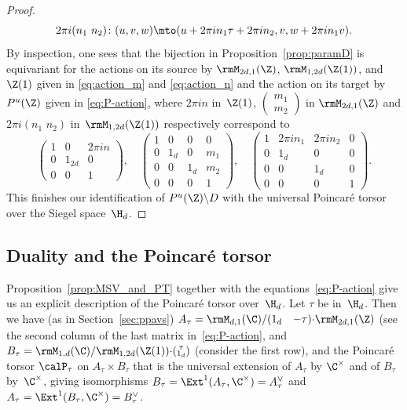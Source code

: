 \begin{proof}
\begin{equation}
\label{eq:action_n}
2\pi i(n_1\,\, n_2)\colon (u,v,w)\mto
(u+2\pi i n_1\tau+2\pi i n_2, v, w+2\pi i n_1v).
\end{equation}
By inspection, one sees that the bijection in
Proposition~\ref{prop:paramD} is equivariant for the actions on its
source by $\rmM_{2d,1}(\Z)$, $\rmM_{1,2d}(\Z(1))$, and~$\Z(1)$ given
in \eqref{eq:action_m} and \eqref{eq:action_n} and the action on its
target by $P^u(\Z)$ given in \eqref{eq:P-action}, where $2\pi i n$
in~$\Z(1)$, $(\substack{m_1\\m_2})$ in $\rmM_{2d,1}(\Z)$ and $2\pi
i(n_1\,\, n_2)$ in~$\rmM_{1,2d}(\Z(1))$ respectively correspond to
\begin{equation}\label{eq:equiv-actions}
\begin{pmatrix}
1 & 0 & 2\pi in\\
0 & 1_{2d} & 0\\
0 & 0 & 1
\end{pmatrix},\quad
\begin{pmatrix}
1 & 0 & 0 & 0\\
0 & 1_d & 0 & m_1\\
0 & 0 & 1_d & m_2\\
0 & 0 & 0 & 1
\end{pmatrix},\quad
\begin{pmatrix}
1 & 2\pi in_1 & 2\pi in_2 & 0\\
0 & 1_d & 0 & 0\\
0 & 0 & 1_d & 0\\
0 & 0 & 0 & 1
\end{pmatrix}.
\end{equation}
This finishes our identification of $P^u(\Z)\backslash D$ with the
universal Poincaré torsor over the Siegel space~$\H_d$.
\Changelback
\end{proof}


\subsection{Duality and the Poincaré torsor}\label{sec4.7}
Proposition~\ref{prop:MSV_and_PT} together with the
equations~\eqref{eq:P-action} give us an explicit description of the
Poincaré torsor over~$\H_d$. Let $\tau$ be in~$\H_d$. Then we have
(as in Section~\ref{sec:ppavs})
$A_\tau=\rmM_{d,1}(\C)/ (\begin{matrix} 1_d &
-\tau\end{matrix}){\cdot}\rmM_{2d,1}(\Z)$ (see the second column of the
last matrix in~\eqref{eq:P-action}, and
$B_\tau=\rmM_{1,d}(\C)/\rmM_{1,2d}(\Z(1)){\cdot}(\substack{\tau\\1_d})$
(consider the first row), and the Poincaré torsor $\calP_\tau$ on
$A_\tau\times B_\tau$ that is the universal extension of $A_\tau$ by
$\C^\times$ and of $B_\tau$ by~$\C^\times$, giving isomorphisms
$B_\tau=\Ext^1(A_\tau,\C^\times)=A_\tau^\vee$ and
$A_\tau=\Ext^1(B_\tau,\C^\times)=B_\tau^\vee$.


